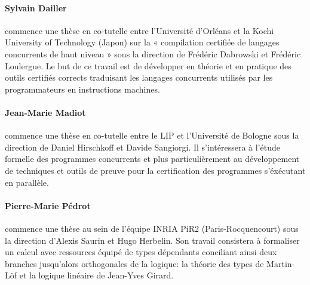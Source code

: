 \documentclass[11pt]{article}
\begin{document}
\paragraph{Sylvain Dailler} commence une thèse en co-tutelle entre
l'Université d'Orléans et la Kochi University of Technology (Japon)
sur la « compilation certifiée de langages concurrents de haut niveau »
sous la direction de Frédéric Dabrowski et Frédéric Loulergue.
Le but de ce travail est de développer en théorie et en pratique des
outils certifiés corrects traduisant les langages concurrents utilisés
par les programmateurs en instructions machines.

\paragraph{Jean-Marie Madiot} commence une thèse en co-tutelle entre
le LIP et l'Université de Bologne sous la direction de Daniel Hirschkoff
et Davide Sangiorgi. Il s'intéressera à l'étude formelle des programmes
concurrents et plus particulièrement au développement de techniques et
outils de preuve pour la certification des programmes s'éxécutant en
parallèle.

\paragraph{Pierre-Marie Pédrot} commence une thèse au sein de l'équipe
INRIA PiR2 (Paris-Rocquencourt) sous la direction d'Alexis Saurin et Hugo
Herbelin. Son travail consistera à formaliser un  calcul avec ressources
équipé de types dépendants conciliant ainsi deux branches jusqu'alors
orthogonales de la logique: la théorie des types de Martin-Löf et la logique
linéaire de Jean-Yves Girard.
\end{document}
